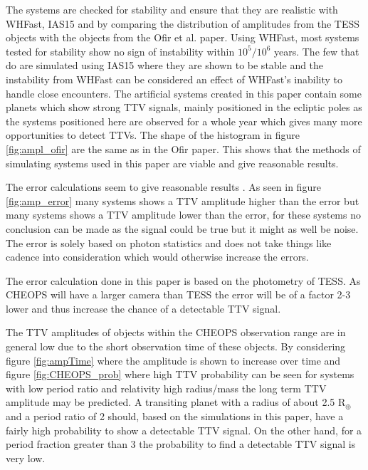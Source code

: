 \documentclass[12pt]{report}
\begin{document}
	The systems are checked for stability and ensure that they are realistic with WHFast, IAS15 and by comparing the distribution of amplitudes from the TESS objects with the objects from the Ofir et al. paper. Using WHFast, most systems tested for stability show no sign of instability within $10^5 / 10^6$ years. The few that do are simulated using IAS15 where they are shown to be stable and the instability from WHFast can be considered an effect of WHFast's inability to handle close encounters. The artificial systems created in this paper contain some planets which show strong TTV signals, mainly positioned in the ecliptic poles as the systems positioned here are observed for a whole year which gives many more opportunities to detect TTVs. The shape of the histogram in figure \ref{fig:ampl_ofir} are the same as in the Ofir paper. This shows that the methods of simulating systems used in this paper are viable and give reasonable results.
	
	The error calculations seem to give reasonable results \citep{2015ApJ...812L..18B}. As seen in figure \ref{fig:amp_error} many systems shows a TTV amplitude higher than the error but many systems shows a TTV amplitude lower than the error, for these systems no conclusion can be made as the signal could be true but it might as well be noise. The error is solely based on photon statistics and does not take things like cadence into consideration which would otherwise increase the errors. 
	
	The error calculation done in this paper is based on the photometry of TESS. As CHEOPS will have a larger camera than TESS the error will be of a factor 2-3 lower and thus increase the chance of a detectable TTV signal.
	
	The TTV amplitudes of objects within the CHEOPS observation range are in general low due to the short observation time of these objects. By considering figure \ref{fig:ampTime} where the amplitude is shown to increase over time and figure \ref{fig:CHEOPS_prob} where high TTV probability can be seen for systems with low period ratio and relativity high radius/mass the long term TTV amplitude may be predicted. A transiting planet with a radius of about 2.5 R$_{\oplus}$ and a period ratio of 2 should, based on the simulations in this paper, have a fairly high probability to show a detectable TTV signal. On the other hand, for a period fraction greater than 3 the probability to find a detectable TTV signal is very low.


	
	
\end{document}
